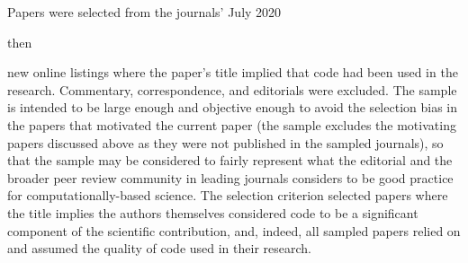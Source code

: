 \documentclass[10pt,a4paper]{article}
\begin{document}
Papers were selected from the journals' July 2020 \begin{change}then\end{change} new online listings where the paper's title implied that code had been used in the research. Commentary, correspondence, and editorials were excluded. The sample is intended to be large enough and objective enough to avoid the selection bias in the papers that motivated the current paper (the sample excludes the motivating papers discussed above as they were not published in the sampled journals), so that the sample may be considered to fairly represent what the editorial and the broader peer review community in leading journals considers to be good practice for computationally-based science. The selection criterion selected papers where the title implies the authors themselves considered code to be a significant component of the scientific contribution, and, indeed, all sampled papers relied on and assumed the quality of code used in their research. 
\end{document}
